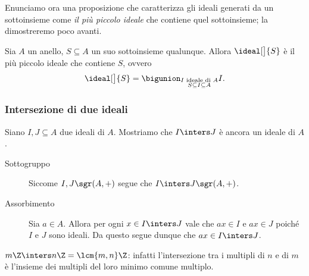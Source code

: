 Enunciamo ora una proposizione che caratterizza gli ideali generati da un sottoinsieme come \emph{il più piccolo ideale} che contiene quel sottoinsieme; la dimostreremo poco avanti.

\begin{proposition}
    \label{prop:gen_ideal_smallest_containing_S}
    Sia $A$ un anello, $S \subseteq A$ un suo sottoinsieme qualunque. Allora $\ideal[\big]{S}$ è il più piccolo ideale che contiene $S$, ovvero \[
        \ideal[\big]{S} = \bigunion_{\substack{I \text{ ideale di }A \\ S \subseteq I \subseteq A}} I.  
    \]
\end{proposition}

\subsubsection{Intersezione di due ideali}

Siano $I, J \subseteq A$ due ideali di $A$. Mostriamo che $I \inters J$ è ancora un ideale di $A$.
\begin{description}
    \item[Sottogruppo] Siccome $I, J \sgr (A, +)$ segue che $I \inters J \sgr (A, +)$.
    \item[Assorbimento] Sia $a \in A$. Allora per ogni $x \in I \inters J$ vale che $ax \in I$ e $ax \in J$ poiché $I$ e $J$ sono ideali. Da questo segue dunque che $ax \in I \inters J$.
\end{description}

\begin{example}
    $m\Z \inters n\Z = \lcm{m, n}\Z$: infatti l'intersezione tra i multipli di $n$ e di $m$ è l'insieme dei multipli del loro minimo comune multiplo.
\end{example}

